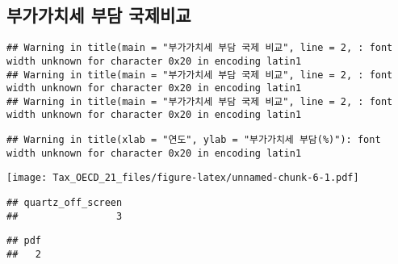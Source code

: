\documentclass[
]{article}
\begin{document}
\subsection{부가가치세 부담
국제비교}\label{uxbd80uxac00uxac00uxce58uxc138-uxbd80uxb2f4-uxad6duxc81cuxbe44uxad50}

\begin{verbatim}
## Warning in title(main = "부가가치세 부담 국제 비교", line = 2, : font width unknown for character 0x20 in encoding latin1
## Warning in title(main = "부가가치세 부담 국제 비교", line = 2, : font width unknown for character 0x20 in encoding latin1
## Warning in title(main = "부가가치세 부담 국제 비교", line = 2, : font width unknown for character 0x20 in encoding latin1
\end{verbatim}

\begin{verbatim}
## Warning in title(xlab = "연도", ylab = "부가가치세 부담(%)"): font width unknown for character 0x20 in encoding latin1
\end{verbatim}

\texttt{[image: Tax\_OECD\_21\_files/figure-latex/unnamed-chunk-6-1.pdf]}

\begin{verbatim}
## quartz_off_screen 
##                 3
\end{verbatim}

\begin{verbatim}
## pdf 
##   2
\end{verbatim}
\end{document}
